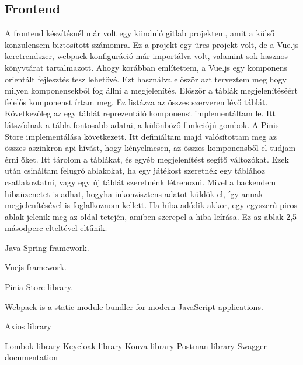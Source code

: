 \documentclass[a4paper,twoside]{article}
\begin{document}
\subsection{Frontend}
A frontend készítésnél már volt egy kiinduló gitlab projektem, amit a külső konzulensem
biztosított számomra. Ez a projekt egy üres projekt volt, de a Vue.js keretrendszer, webpack
konfiguráció már importálva volt, valamint sok hasznos könyvtárat tartalmazott. Ahogy
korábban említettem, a Vue.js egy komponens orientált fejlesztés tesz lehetővé. Ezt használva
először azt terveztem meg hogy milyen komponensekből fog állni a megjelenítés.
Először a táblák megjelenítéséért felelős komponenst írtam meg. Ez listázza az összes
szerveren lévő táblát.
Következőleg az egy táblát reprezentáló komponenst implementáltam le. Itt látszódnak a tábla
fontosabb adatai, a különböző funkciójú gombok.
A Pinis Store implementálása következett. Itt definiáltam majd valósítottam meg az összes
aszinkron api hívást, hogy kényelmesen, az összes komponensből el tudjam érni őket. Itt
tárolom a táblákat, és egyéb megjelenítést segítő változókat.
Ezek után csináltam felugró ablakokat, ha egy játékost szeretnék egy táblához csatlakoztatni,
vagy egy új táblát szeretnénk létrehozni.
Mivel a backendem hibaüzenetet is adhat, hogyha inkonzisztens adatot küldök el, így annak
megjelenítésével is foglalkoznom kellett. Ha hiba adódik akkor, egy egyszerű piros ablak
jelenik meg az oldal tetején, amiben szerepel a hiba leírása. Ez az ablak 2,5 másodperc
elteltével eltűnik.



\newpage
\begin{thebibliography}{9}
	Java Spring framework.
	
	Vuejs framework.
	
	Pinia Store library.
	
	 Webpack is a static module bundler for modern JavaScript applications.
	 
	 Axios library
	 
	 Lombok library
	 Keycloak library
	 Konva library
	 Postman library
	 Swagger documentation
\end{thebibliography}
\end{document}
